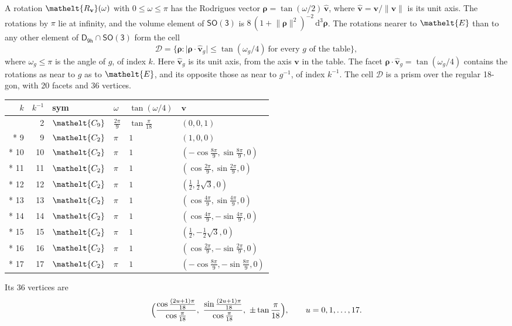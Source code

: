 \documentclass[10pt,a4paper]{article}
\numberwithin{equation}{section}
\newcommand{\eltfont}[1]{{\let\sigma\eltsigma\mathelt{#1}}}
\newcommand{\grp}[1]{\mathsf{#1}}
\newcommand{\cls}[1]{\eltfont{#1}}
\newcommand{\elt}[1]{\eltfont{#1}}
\newcommand{\dirvec}[3]{(#1, #2, #3)}
\newcommand{\unitaxis}{\hat{\mathbf{v}}}
\newcommand{\vv}{\mathbf{v}}
\newcommand{\diff}{\mathrm{d}}
\newcommand{\rodrigues}{\boldsymbol{\rho}}
\newcommand{\fcell}{\mathcal{D}}
\begin{document}
\leavevmode\label{n:vector.rodrigues}\label{n:vector.unitaxis}A rotation $\elt{R_{\vv}}(\omega)$ with $0 \le \omega \le \pi$ has the Rodrigues vector $\rodrigues = \tan(\omega/2)\,\unitaxis$, where $\unitaxis = \vv/\lVert\vv\rVert$ is its unit axis. The rotations by $\pi$ lie at infinity, and the volume element of \href{SO3.pdf}{$\grp{SO(3)}$} is $8\,(1 + \lVert\rodrigues\rVert^2)^{-2}\,\diff^3\rodrigues$.
\leavevmode\label{n:set.cell}The rotations nearer to $\elt{E}$ than to any other element of $\grp{D_{9h}} \cap \grp{SO(3)}$ form the cell
\begin{equation}\label{e:cell}\fcell = \bigl\{\rodrigues : \lvert\rodrigues\cdot\unitaxis_g\rvert \le \tan(\omega_g/4)\ \text{for every $g$ of the table}\bigr\},\end{equation}
where $\omega_g \le \pi$ is the angle of $g$, of index $k$. Here $\unitaxis_g$ is its unit axis, from the axis $\vv$ in the table. The facet $\rodrigues\cdot\unitaxis_g = \tan(\omega_g/4)$ contains the rotations as near to $g$ as to $\elt{E}$, and its opposite those as near to $g^{-1}$, of index $k^{-1}$. The cell $\fcell$ is a prism over the regular 18-gon, with 20 facets and 36 vertices.
{\small{\renewcommand{\arraystretch}{1.3}\begin{longtable}{@{}rrllll@{}}\toprule
$k$ & $k^{-1}$ & sym & $\omega$ & $\tan(\omega/4)$ & $\vv$\\\midrule\endhead
\bottomrule\endfoot\endlastfoot
1 & 2 & $\cls{C_{9}}$ & $\tfrac{2\pi}{9}$ & $\tan\tfrac{\pi}{18}$ & $\dirvec{0}{0}{1}$\\*
9 & 9 & $\cls{C_{2}}$ & $\pi$ & $1$ & $\dirvec{1}{0}{0}$\\*
10 & 10 & $\cls{C_{2}}$ & $\pi$ & $1$ & $\dirvec{-\cos\tfrac{8\pi}{9}}{\sin\tfrac{8\pi}{9}}{0}$\\*
11 & 11 & $\cls{C_{2}}$ & $\pi$ & $1$ & $\dirvec{\cos\tfrac{2\pi}{9}}{\sin\tfrac{2\pi}{9}}{0}$\\*
12 & 12 & $\cls{C_{2}}$ & $\pi$ & $1$ & $\dirvec{\tfrac{1}{2}}{\tfrac{1}{2}\sqrt{3}}{0}$\\*
13 & 13 & $\cls{C_{2}}$ & $\pi$ & $1$ & $\dirvec{\cos\tfrac{4\pi}{9}}{\sin\tfrac{4\pi}{9}}{0}$\\*
14 & 14 & $\cls{C_{2}}$ & $\pi$ & $1$ & $\dirvec{\cos\tfrac{4\pi}{9}}{-\sin\tfrac{4\pi}{9}}{0}$\\*
15 & 15 & $\cls{C_{2}}$ & $\pi$ & $1$ & $\dirvec{\tfrac{1}{2}}{-\tfrac{1}{2}\sqrt{3}}{0}$\\*
16 & 16 & $\cls{C_{2}}$ & $\pi$ & $1$ & $\dirvec{\cos\tfrac{2\pi}{9}}{-\sin\tfrac{2\pi}{9}}{0}$\\*
17 & 17 & $\cls{C_{2}}$ & $\pi$ & $1$ & $\dirvec{-\cos\tfrac{8\pi}{9}}{-\sin\tfrac{8\pi}{9}}{0}$\\
\bottomrule\end{longtable}}}
\leavevmode\label{n:local.vertex.u}Its 36 vertices are
\begin{equation}\label{e:prism}\Bigl(\frac{\cos\frac{(2u+1)\pi}{18}}{\cos\frac{\pi}{18}},\ \frac{\sin\frac{(2u+1)\pi}{18}}{\cos\frac{\pi}{18}},\ \pm\tan\frac{\pi}{18}\Bigr),\qquad u = 0, 1, \dots, 17.\end{equation}
\end{document}
